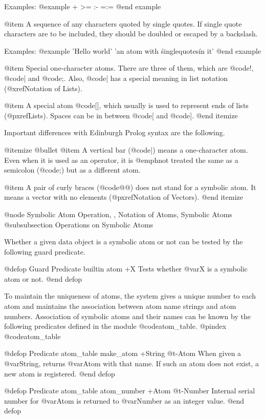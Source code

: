 {{Examples:
@example
+   >=   :-   =:=
@end example

@item
A sequence of any characters quoted by single quotes.  If single quote
characters are to be included, they should be doubled or escaped by a
backslash.

Examples:
@example
'Hello world'    'an atom with \'singlequotes\' in it'
@end example

@item
Special one-character atoms.  There are three of them, which are
@code{!}, @code{|} and @code{;}.  Also, @code{|} has a special meaning
in list notation (@xref{Notation of Lists}).

@item
A special atom @code{[]}, which usually is used to represent ends of
lists (@pxref{Lists}).  Spaces can be in between @code{[} and @code{]}.
@end itemize

Important differences with Edinburgh Prolog syntax are the following.

@itemize @bullet
@item
A vertical bar (@code{|}) means a one-character atom.  Even when it is
used as an operator, it is @emph{not} treated the same as a semicolon
(@code{;}) but as a different atom.

@item
A pair of curly braces (@code{@{@}}) does not stand for a symbolic atom.
It means a vector with no elements (@pxref{Notation of Vectors}).
@end itemize

@node Symbolic Atom Operation,  , Notation of Atoms, Symbolic Atoms
@subsubsection Operations on Symbolic Atoms

Whether a given data object is a symbolic atom or not can be tested by
the following guard predicate.

@defop {Guard Predicate} {builtin} atom +X
Tests whether @var{X} is a symbolic atom or not.
@end defop

To maintain the uniqueness of atoms, the system gives a unique number
to each atom and maintains the association between atom name strings and
atom numbers.  Association of symbolic atoms and their names can be
known by the following predicates defined in the module
@code{atom_table}.
@pindex @code{atom_table}

@defop {Predicate} {atom_table} make_atom +String @t{-}Atom
When given a @var{String}, returns @var{Atom} with that name.  If such
an atom does not exist, a new atom is registered.
@end defop

@defop {Predicate} {atom_table} atom_number +Atom @t{-}Number
Internal serial number for @var{Atom} is returned to @var{Number} as an
integer value.
@end defop

}}
